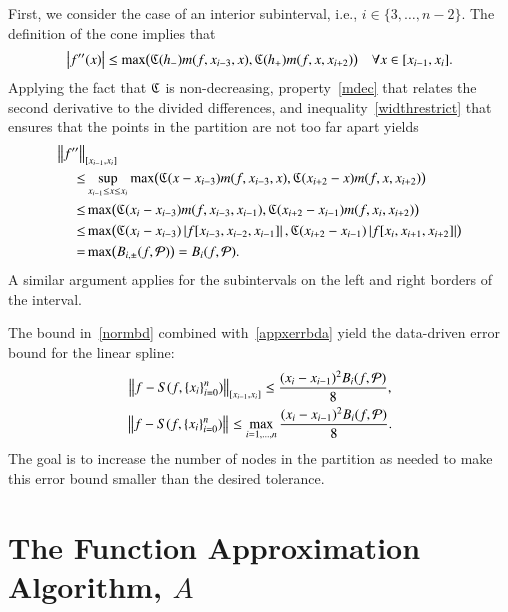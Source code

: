 \documentclass[review]{elsarticle}
\newcommand{\datasites}{\{x_i\}_{i=0}^n}
\theoremstyle{definition}
\begin{document}
First, we consider the case of an interior subinterval, i.e., $i \in \{3,
\ldots, n-2\}$. The definition of the cone implies that
\begin{equation*}
\left \lvert f''(x) \right \rvert \le \max\bigl(\mathfrak{C}(h_-)m(f,x_{i-3},x),\mathfrak{C}(h_+)m(f,x,x_{i+2})\bigr)  \quad  \forall x \in [x_{i-1},x_i].
\end{equation*}
Applying the fact that $\mathfrak{C}$ is non-decreasing, property~\eqref{mdec} that
relates the second derivative to the divided differences, and
inequality~\eqref{widthrestrict} that ensures that the points in the partition
are not too far apart yields
\begin{align*}
\nonumber
\MoveEqLeft{\norm[{[x_{i-1},x_i]}]{f''}}\\
\nonumber
 \le  & \sup_{x_{i-1} \le x \le x_i} \max\bigl(\fC(x-x_{i-3})m(f,x_{i-3},x),\fC(x_{i+2}-x)m(f,x,x_{i+2})\bigr)  \\
\nonumber
 \le  &  \max\bigl(\fC(x_{i}-x_{i-3})m(f,x_{i-3},x_{i-1}),\fC(x_{i+2}-x_{i-1})m(f,x_i,x_{i+2})\bigr) \\
\nonumber  \le & \max\bigl(\fC(x_{i}-x_{i-3})\abs{f[x_{i-3},x_{i-2},x_{i-1}]},\bigr.
 \fC(x_{i+2}-x_{i-1})\abs{f[x_i,x_{i+1},x_{i+2}]}\bigr) \\
 =  & \max\bigl(B_{i,\pm}(f,\cp)\bigr) = B_i(f,\cp).
\end{align*}
A similar argument applies for the subintervals on the left and right borders of
the interval.

The bound in~\eqref{normbd} combined with~\eqref{appxerrbda} yield the
data-driven error bound for the linear spline:
\begin{subequations} \label{appxerrbdb}
\begin{gather}
\norm[{[x_{i-1},x_i]}]{f - S(f,\datasites)} \le \frac{(x_i - x_{i-1})^2 B_{i}(f,\cp)}{8} , \\
\norm{f - S(f,\datasites)} \le
\max_{i=1, \ldots, n} \frac{(x_i - x_{i-1})^2 B_{i}(f,\cp)}{8} .
\end{gather}
\end{subequations}
The goal is to increase the number of nodes in the partition as needed to make
this error bound smaller than the desired tolerance.

\section{The Function Approximation Algorithm, $A$}\label{sec:fappx}
\end{document}
